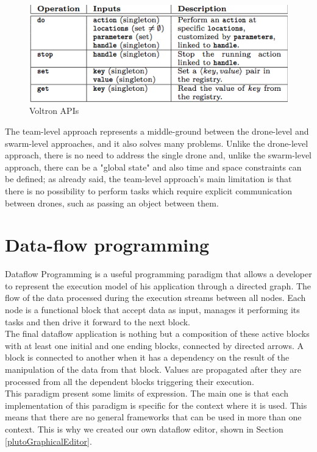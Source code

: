 \begin{figure}[htbp]
  \centering
  \includegraphics[width=\linewidth]{pictures/Voltron.png}
  \caption{Voltron APIs}
  \label{fig:voltron}
\end{figure}


The team-level approach represents a  middle-ground between the drone-level and swarm-level approaches, and it also solves many problems. Unlike the drone-level approach, there is no need to address the single drone and, unlike the swarm-level approach, there can be a "global state" and also time and space constraints can be defined; as already said, the team-level approach's main limitation is that there is no possibility to perform tasks which require explicit communication between drones, such as passing an object between them.
\\

\section{Data-flow programming}\label{dataflow}

Dataflow Programming is a useful programming paradigm that allows a developer to represent the execution model of his application through a directed graph. The flow of the data processed during the execution streams between all nodes. Each node is a functional block that accept data as input, manages it performing its tasks and then drive it forward to the next block. 
\\
The final dataflow application is nothing but a composition of these active blocks with at least one initial and one ending blocks, connected by directed arrows.
A block is connected to another when it has a dependency on the result of the manipulation of the data from that block. Values are propagated after they are processed from all the dependent blocks triggering their execution.
\\

This paradigm present some limits of expression.
The main one is that each implementation of this paradigm is specific for the context where it is used. This means that there are no general frameworks that can be used in more than one context. This is why we created our own dataflow editor, shown in Section \ref{plutoGraphicalEditor}.

